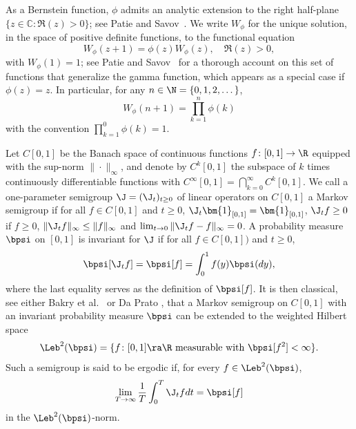 As a Bernstein function, $\phi$ admits an analytic extension to the right half-plane $\{z \in \mathbb{C} : \Re(z)\!>\!0\}$; see \eg Patie and Savov~\cite[Chap.\,4]{Patie-Savov-GeL}. We write $W_{\phi}$ for the unique solution, in the space of positive definite functions, to the functional equation
\begin{equation*}
W_{\phi}(z+1)=\phi(z)W_{\phi}(z), \quad \Re(z)>0,
\end{equation*}
with $W_{\phi}(1)=1$; see Patie and Savov~\cite{Patie-Savov-Bern} for a thorough account on this set of functions that generalize the gamma function, which appears as a special case if $\phi(z)=z$. In particular, for any
$n\in \N = \{0,1,2, \dots\}$,
\begin{equation}
\label{eq:product-Wphi}
W_{\phi}(n+1)=\prod_{k=1}^n \phi(k)
\end{equation}
with the convention $\prod_{k=1}^0 \phi(k) = 1$.

Let $C[0,1]$ be the Banach space of continuous functions $f \colon [0,1] \to \R$ equipped with the
sup-norm $\| {\cdot} \|_\infty$, and denote by $C^k[0,1]$ the subspace of $k$ times continuously
differentiable functions with $C^\infty[0,1] = \bigcap_{k=0}^\infty C^k[0,1]$. We call a one-parameter semigroup
$\J = (\J_t)_{t \geq 0}$ of linear operators on $C[0,1]$ a Markov semigroup if for all $f \in C[0,1]$ and $t \ge 0$,
$\J_t \bm{1}_{[0,1]} = \bm{1}_{[0,1]}$, $\J_t f \geq 0$ if $f \geq 0$, $\|\J_t f\|_\infty \leq \|f\|_\infty$
and $\lim_{t\to 0} \|\J_t f - f\|_\infty = 0$. A probability measure $\bpsi$ on $[0,1]$ is invariant for $\J$ if for all $f \in C[0,1])$ and $t \ge 0$,
\begin{equation*}
\bpsi [ \J_t f ] = \bpsi[f] =\int_0^1 f(y)\bpsi(dy),
\end{equation*}
where the last equality serves as the definition of $\bpsi[f]$. It is then classical, see either Bakry et al.~\cite{Bakry_Book} or Da Prato \cite{da-prato:2006}, that a Markov semigroup on $C[0,1]$ with an invariant probability measure $\bpsi$
can be extended to the weighted Hilbert space
\begin{equation*}
\Leb^2(\bpsi) =\lbrace f \colon [0,1] \ra \R \textrm{ measurable with } \bpsi[f^2] <\infty\rbrace.
\end{equation*}
Such a semigroup is said to be ergodic if, for every $f \in \Leb^2(\bpsi)$,\vspace*{-3pt}
\[
\lim_{T \to \infty} \frac{1}{T} \int_0^T \J_t f dt = \bpsi[f]
\]
in the $\Leb^2(\bpsi)$-norm.

